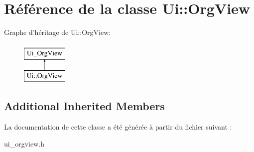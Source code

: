 \hypertarget{class_ui_1_1_org_view}{\section{Référence de la classe Ui\-:\-:Org\-View}
\label{class_ui_1_1_org_view}
}
Graphe d'héritage de Ui\-:\-:Org\-View\-:\begin{figure}[H]
\begin{center}
\leavevmode
\includegraphics[height=2.000000cm]{class_ui_1_1_org_view}
\end{center}
\end{figure}
\subsection*{Additional Inherited Members}


La documentation de cette classe a été générée à partir du fichier suivant \-:\begin{DoxyCompactItemize}
\item 
ui\-\_\-orgview.\-h\end{DoxyCompactItemize}
